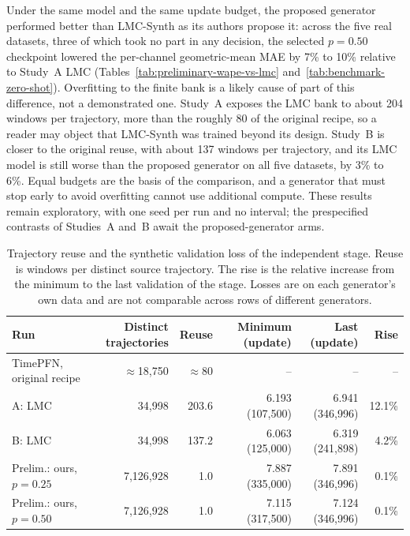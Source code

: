 Under the same model and the same update budget, the proposed generator
performed better than LMC-Synth as its authors propose it: across the five
real datasets, three of which took no part in any decision, the selected
$p=0.50$ checkpoint lowered the per-channel geometric-mean MAE by 7\% to 10\%
relative to Study~A LMC (Tables~\ref{tab:preliminary-wape-vs-lmc}
and~\ref{tab:benchmark-zero-shot}). Overfitting to the finite bank is a likely
cause of part of this difference, not a demonstrated one. Study~A exposes the
LMC bank to about 204 windows per trajectory, more than the roughly 80 of the
original recipe, so a reader may object that LMC-Synth was trained beyond its
design. Study~B is closer to the original reuse, with about 137 windows per
trajectory, and its LMC model is still worse than the proposed generator on
all five datasets, by 3\% to 6\%. Equal budgets are the basis of the
comparison, and a generator that must stop early to avoid overfitting cannot
use additional compute. These results remain exploratory, with one seed per
run and no interval; the prespecified contrasts of Studies~A and~B await the
proposed-generator arms.

\begin{table}[H]
\centering\small\setlength{\tabcolsep}{4pt}
\caption{Trajectory reuse and the synthetic validation loss of the independent
stage. Reuse is windows per distinct source trajectory. The rise is the
relative increase from the minimum to the last validation of the stage.
Losses are on each generator's own data and are not comparable across rows
of different generators.}
\label{tab:reuse-overfitting}
\begin{tabular}{lrrrrr}\toprule
Run & Distinct trajectories & Reuse & Minimum (update) & Last (update) & Rise \\\midrule
TimePFN, original recipe & $\approx$18,750 & $\approx$80 & -- & -- & -- \\
A: LMC & 34,998 & 203.6 & 6.193 (107,500) & 6.941 (346,996) & 12.1\% \\
B: LMC & 34,998 & 137.2 & 6.063 (125,000) & 6.319 (241,898) & 4.2\% \\
Prelim.: ours, $p=0.25$ & 7,126,928 & 1.0 & 7.887 (335,000) & 7.891 (346,996) & 0.1\% \\
Prelim.: ours, $p=0.50$ & 7,126,928 & 1.0 & 7.115 (317,500) & 7.124 (346,996) & 0.1\% \\\bottomrule
\end{tabular}
\end{table}

